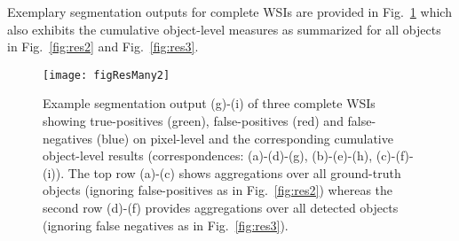 \documentclass{elsarticle}
\begin{document}
Exemplary segmentation outputs for complete WSIs are provided in Fig.~\ref{fig:exoutput} which also exhibits the cumulative object-level measures as summarized for all objects in Fig.~\ref{fig:res2} and Fig.~\ref{fig:res3}. %
%
%
\begin{figure} \center
	\texttt{[image: figResMany2]}
	\caption{Example segmentation output (g)-(i) of three complete WSIs showing true-positives (green), false-positives (red) and false-negatives (blue) on pixel-level and the corresponding cumulative object-level results (correspondences: (a)-(d)-(g), (b)-(e)-(h), (c)-(f)-(i)).
	The top row (a)-(c) shows aggregations over all ground-truth objects (ignoring false-positives as in Fig.~\ref{fig:res2}) whereas the second row (d)-(f) provides aggregations over all detected objects (ignoring false negatives as in Fig.~\ref{fig:res3}). 
		}
	\label{fig:exoutput}
\end{figure}
\end{document}
